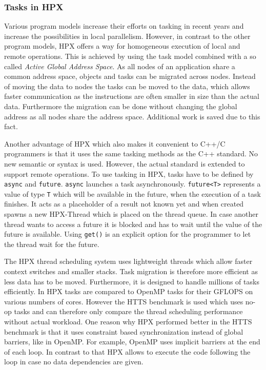 	
\subsubsection{Tasks in HPX}
  Various program models increase their efforts on tasking in recent years and increase the possibilities in local parallelism.
  However, in contrast to the other program models, HPX offers a way for homogeneous execution of local and remote operations.
  This is achieved by using the task model combined with a so called \textit{Active Global Address Space}.
  As all nodes of an application share a common address space, objects and tasks can be migrated across nodes.
  Instead of moving the data to nodes the tasks can be moved to the data, which allows faster communication as the instructions are often smaller in size than the actual data.
  Furthermore the migration can be done without changing the global address as all nodes share the address space.
  Additional work is saved due to this fact.~\cite{Kaiser.2014}
  
  Another advantage of HPX which also makes it convenient to C++/C programmers is that it uses the same tasking methods as the C++ standard.
  No new semantic or syntax is used.
  However, the actual standard is extended to support remote operations.
  To use tasking in HPX, tasks have to be defined by \texttt{async} and \texttt{future}.
  \texttt{async} launches a task asynchronously.
  \texttt{future<T>} represents a value of type \texttt{T} which will be available in the future, when the execution of a task finishes.
  It acts as a placeholder of a result not known yet and when created spawns a new HPX-Thread which is placed on the thread queue.
  In case another thread wants to access a future it is blocked and has to wait until the value of the future is available.
  Using \texttt{get()} is an explicit option for the programmer to let the thread wait for the future.~\cite{Kaiser.2014}~\cite{TheSTEARGroup.2020}
  
  
  The HPX thread scheduling system uses lightweight threads which allow faster context switches and smaller stacks.
  Task migration is therefore more efficient as less data has to be moved.
  Furthermore, it is designed to handle millions of tasks efficiently.
  In \cite{Kaiser.2014} HPX tasks are compared to OpenMP tasks for their GFLOPS on various numbers of cores.
  However the HTTS benchmark is used which uses no-op tasks and can therefore only compare the thread scheduling performance without actual workload.
  One reason why HPX performed better in the HTTS benchmark is that it uses constraint based synchronization instead of global barriers, like in OpenMP.
  For example, OpenMP uses implicit barriers at the end of each loop.
  In contrast to that HPX allows to execute the code following the loop in case no data dependencies are given.
  
